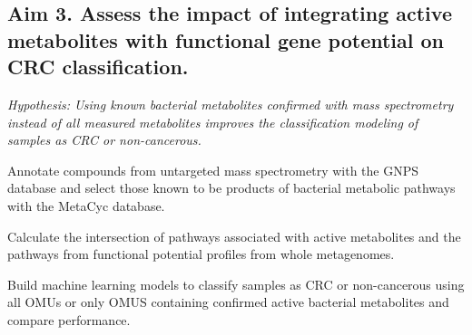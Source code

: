 \documentclass[11pt]{article}
\begin{document}
\subsection*{Aim 3. Assess the impact of integrating active metabolites with functional gene potential on CRC classification.}
\textit{Hypothesis: Using known bacterial metabolites confirmed with mass spectrometry instead of all measured metabolites improves the classification modeling of samples as CRC or non-cancerous.}

\begin{compactenum}[A.]
    \item Annotate compounds from untargeted mass spectrometry with the GNPS database and select those known to be products of bacterial metabolic pathways with the MetaCyc database.
    \item Calculate the intersection of pathways associated with active metabolites and the pathways from functional potential profiles from whole metagenomes.
    \item Build machine learning models to classify samples as CRC or non-cancerous using all OMUs or only OMUS containing confirmed active bacterial metabolites and compare performance.
\end{compactenum}
\end{document}
